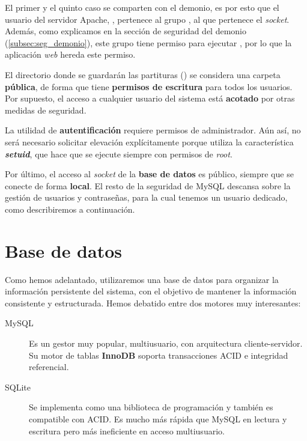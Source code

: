 El primer y el quinto caso se comparten con el demonio, es por esto que el usuario del servidor Apache, , pertenece al grupo , al que pertenece el \textit{socket}. Además, como explicamos en la sección de seguridad del demonio (\ref{subsec:seg_demonio}), este grupo tiene permiso para ejecutar , por lo que la aplicación \textit{web} hereda este permiso.

El directorio donde se guardarán las partituras () se considera una carpeta \textbf{pública}, de forma que tiene \textbf{permisos de escritura} para todos los usuarios. Por supuesto, el acceso a cualquier usuario del sistema está \textbf{acotado} por otras medidas de seguridad.

La utilidad de \textbf{autentificación} requiere permisos de administrador. Aún así, no será necesario solicitar elevación explícitamente porque utiliza la característica \textbf{\textit{setuid}}, que hace que se ejecute siempre con permisos de \textit{root}.

Por último, el acceso al \textit{socket} de la \textbf{base de datos} es público, siempre que se conecte de forma \textbf{local}. El resto de la seguridad de MySQL descansa sobre la gestión de usuarios y contraseñas, para la cual tenemos un usuario dedicado, como describiremos a continuación.

\section{Base de datos}

Como hemos adelantado, utilizaremos una base de datos para organizar la información persistente del sistema, con el objetivo de mantener la información consistente y estructurada. Hemos debatido entre dos motores muy interesantes:

\begin{description}
	\item[MySQL] Es un gestor muy popular, multiusuario, con arquitectura cliente-servidor. Su motor de tablas \textbf{InnoDB} soporta transacciones \acrshort{ACID} e integridad referencial. \cite{wiki_innodb}
	
	\item[SQLite] Se implementa como una biblioteca de programación y también es compatible con \acrshort{ACID}. Es mucho más rápida que MySQL en lectura y escritura pero más ineficiente en acceso multiusuario.
\end{description}

